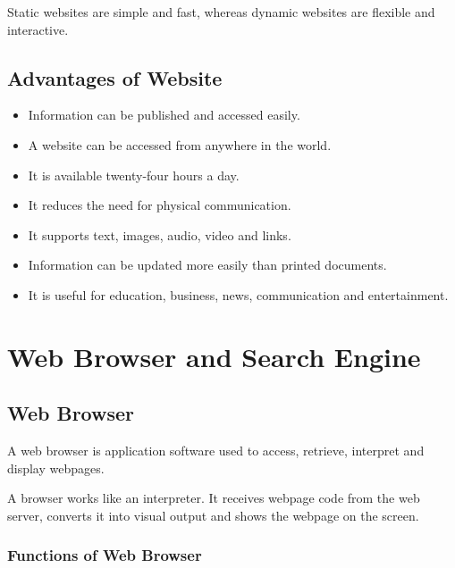 \begin{summarybox}
Static websites are simple and fast, whereas dynamic websites are flexible and interactive.
\end{summarybox}

\subsection{Advantages of Website}

\begin{itemize}
    \item Information can be published and accessed easily.
    \item A website can be accessed from anywhere in the world.
    \item It is available twenty-four hours a day.
    \item It reduces the need for physical communication.
    \item It supports text, images, audio, video and links.
    \item Information can be updated more easily than printed documents.
    \item It is useful for education, business, news, communication and entertainment.
\end{itemize}

\section{Web Browser and Search Engine}

\subsection{Web Browser}

\begin{definitionbox}
A web browser is application software used to access, retrieve, interpret and display webpages.
\end{definitionbox}

\Note A browser works like an interpreter. It receives webpage code from the web server, converts it into visual output and shows the webpage on the screen.

\subsubsection{Functions of Web Browser}

